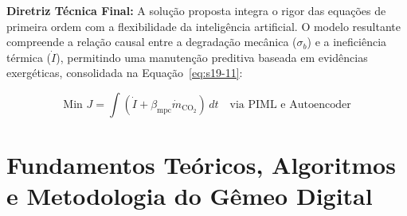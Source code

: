 \documentclass[12pt,a4paper]{article}
\numberwithin{equation}{section}
\numberwithin{table}{section}
\numberwithin{figure}{section}
\begin{document}
\textbf{Diretriz Técnica Final:} A solução proposta integra o rigor das equações de primeira ordem com a flexibilidade da inteligência artificial. O modelo resultante compreende a relação causal entre a degradação mecânica ($\sigma_b$) e a ineficiência térmica ($\dot{I}$), permitindo uma manutenção preditiva baseada em evidências exergéticas, consolidada na Equação~\eqref{eq:s19-11}:

\begin{equation}\label{eq:s19-11}
\boxed{\text{Min } J = \int (\dot{I} + \beta_{\text{mpc}} \dot{m}_{\text{CO}_2}) \, dt \quad \text{via PIML e Autoencoder}}
\end{equation}

	\clearpage
	\section{Fundamentos Teóricos, Algoritmos e Metodologia do Gêmeo Digital}

\end{document}
